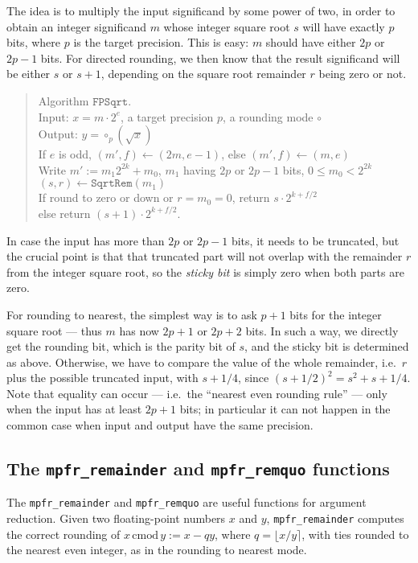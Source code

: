 \documentclass[12pt]{amsart}
\def\cmod{\,\mathrm{cmod}\,}
\begin{document}
The idea is to multiply the input significand by some power of two,
in order to obtain an integer significand $m$ whose integer square root
$s$ will have exactly $p$ bits, where $p$ is the target precision.
This is easy: $m$ should have either $2p$ or $2p-1$ bits.
For directed rounding, we then know that the result significand will be
either $s$ or $s+1$, depending on the square root remainder $r$ being zero
or not.
\begin{quote}
Algorithm $\texttt{FPSqrt}$. \\
Input: $x = m \cdot 2^e$, a target precision $p$, a rounding mode $\circ$ \\
Output: $y = \circ_p(\sqrt{x})$ \\
If $e$ is odd, $(m', f) \leftarrow (2m, e-1)$, else $(m',f) \leftarrow (m,e)$ \\
Write $m' := m_1 2^{2k} + m_0$, $m_1$ having $2p$ or $2p-1$ bits, $0 \leq m_0 < 2^{2k}$ \\
$(s, r) \leftarrow \texttt{SqrtRem}(m_1)$ \\
If round to zero or down or $r=m_0=0$, return $s \cdot 2^{k+f/2}$ \\
else return $(s+1) \cdot 2^{k+f/2}$.
\end{quote}
In case the input has more than $2p$ or $2p-1$ bits, it needs to be truncated,
but the crucial point is that that truncated part will not overlap with the
remainder $r$ from the integer square root, so the \emph{sticky bit} is
simply zero when both parts are zero.

For rounding to nearest, the simplest way is to ask $p+1$ bits for the
integer square root --- thus $m$ has now $2p+1$ or $2p+2$ bits.
In such a way, we directly get the rounding bit, which is the parity bit
of $s$, and the sticky bit is determined as above.
Otherwise, we have to compare the value of the whole remainder, i.e.\ $r$ plus
the possible truncated input, with $s + 1/4$, since $(s+1/2)^2 =
s^2 + s + 1/4$.
Note that equality can occur --- i.e.\ the ``nearest even rounding rule'' ---
only when the input has at least $2p+1$ bits; in particular it can not
happen in the common case when input and output have the same precision.

\subsection{The \texttt{mpfr\_remainder} and \texttt{mpfr\_remquo} functions}

The \texttt{mpfr\_remainder} and \texttt{mpfr\_remquo} are useful
functions for argument reduction. Given two floating-point numbers $x$ and
$y$, \texttt{mpfr\_remainder} computes the correct rounding of
$x \cmod y := x - q y$, where
$q = \lfloor x/y \rceil$, with ties rounded to the nearest even integer,
as in the rounding to nearest mode.
\end{document}
